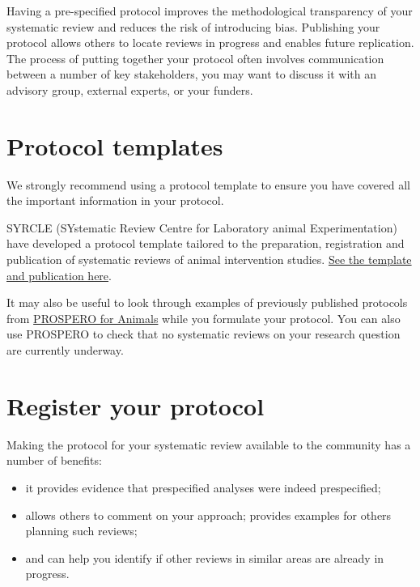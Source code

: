 \documentclass[
]{book}
\providecommand{\tightlist}{%
  \setlength{\itemsep}{0pt}\setlength{\parskip}{0pt}}
\begin{document}
Having a pre-specified protocol improves the methodological transparency of your systematic review and reduces the risk of introducing bias. Publishing your protocol allows others to locate reviews in progress and enables future replication. The process of putting together your protocol often involves communication between a number of key stakeholders, you may want to discuss it with an advisory group, external experts, or your funders.

\hypertarget{protocol-templates}{%
\section{Protocol templates}\label{protocol-templates}}

We strongly recommend using a protocol template to ensure you have covered all the important information in your protocol.

SYRCLE (SYstematic Review Centre for Laboratory animal Experimentation) have developed a protocol template tailored to the preparation, registration and publication of systematic reviews of animal intervention studies. \href{https://onlinelibrary.wiley.com/doi/epdf/10.1002/ebm2.7}{See the template and publication here}.

It may also be useful to look through examples of previously published protocols from \href{https://www.crd.york.ac.uk/prospero/\#searchadvanced}{PROSPERO for Animals} while you formulate your protocol. You can also use PROSPERO to check that no systematic reviews on your research question are currently underway.

\hypertarget{register-your-protocol}{%
\section{Register your protocol}\label{register-your-protocol}}

Making the protocol for your systematic review available to the community has a number of benefits:

\begin{itemize}
\tightlist
\item
  it provides evidence that prespecified analyses were indeed prespecified;
\item
  allows others to comment on your approach; provides examples for others planning such reviews;
\item
  and can help you identify if other reviews in similar areas are already in progress.
\end{itemize}
\end{document}
